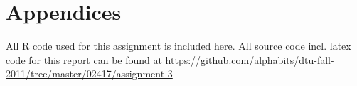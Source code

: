 \def\assignmenttitle{Modelling and Predicting the Number of Airline Passengers}
\def\assignmentnumber{3}
\def\assignmentdate{29-10-2011}





\maketitle


\pagebreak
\section*{Appendices}
All R code used for this assignment is included here. All source code incl. latex code for this report can be found at {\small\url{https://github.com/alphabits/dtu-fall-2011/tree/master/02417/assignment-\assignmentnumber}}

\pagebreak




